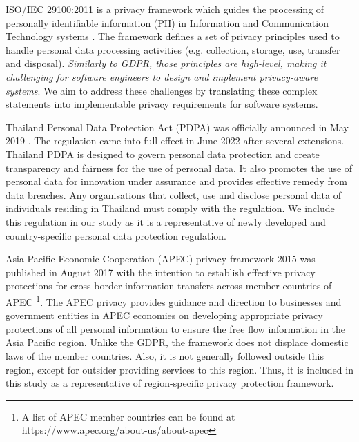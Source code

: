 ISO/IEC 29100:2011 is a privacy framework which guides the processing of personally identifiable information (PII) in Information and Communication Technology systems \cite{ISO/IEC2011}. The framework defines a set of privacy principles used to handle personal data processing activities (e.g. collection, storage, use, transfer and disposal). \emph{Similarly to GDPR, those principles are high-level, making it challenging for software engineers to design and implement privacy-aware systems}. We aim to address these challenges by translating these complex statements into implementable privacy requirements for software systems.

Thailand Personal Data Protection Act (PDPA) was officially announced in May 2019 \cite{PDPA}. The regulation came into full effect in June 2022 after several extensions. Thailand PDPA is designed to govern personal data protection and create transparency and fairness for the use of personal data. It also promotes the use of personal data for innovation under assurance and provides effective remedy from data breaches. Any organisations that collect, use and disclose personal data of individuals residing in Thailand must comply with the regulation. We include this regulation in our study as it is a representative of newly developed and country-specific personal data protection regulation.


Asia-Pacific Economic Cooperation (APEC) privacy framework 2015 \cite{Apec2015} was published in August 2017 with the intention to establish effective privacy protections for cross-border information transfers across member countries of APEC \footnote{A list of APEC member countries can be found at https://www.apec.org/about-us/about-apec}. The APEC privacy provides guidance and direction to businesses and government entities in APEC economies on developing appropriate privacy protections of all personal information to ensure the free flow information in the Asia Pacific region. Unlike the GDPR, the framework does not displace domestic laws of the member countries. Also, it is not generally followed outside this region, except for outsider providing services to this region. Thus, it is included in this study as a representative of region-specific privacy protection framework.

